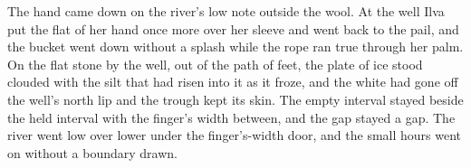 The hand came down on the river's low note outside the wool. At the well Ilva put the flat of her hand once more over her sleeve and went back to the pail, and the bucket went down without a splash while the rope ran true through her palm. On the flat stone by the well, out of the path of feet, the plate of ice stood clouded with the silt that had risen into it as it froze, and the white had gone off the well's north lip and the trough kept its skin. The empty interval stayed beside the held interval with the finger's width between, and the gap stayed a gap. The river went low over lower under the finger's-width door, and the small hours went on without a boundary drawn.
